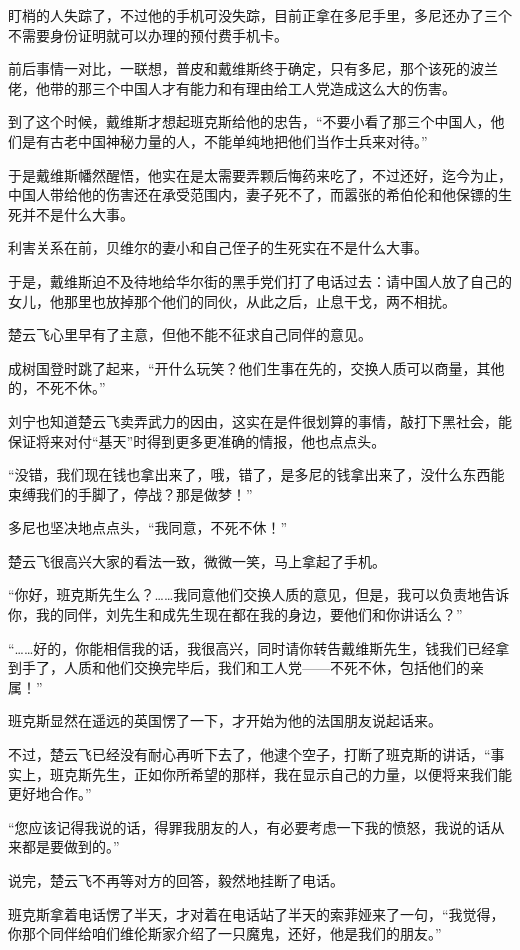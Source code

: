 盯梢的人失踪了，不过他的手机可没失踪，目前正拿在多尼手里，多尼还办了三个不需要身份证明就可以办理的预付费手机卡。

前后事情一对比，一联想，普皮和戴维斯终于确定，只有多尼，那个该死的波兰佬，他带的那三个中国人才有能力和有理由给工人党造成这么大的伤害。

到了这个时候，戴维斯才想起班克斯给他的忠告，“不要小看了那三个中国人，他们是有古老中国神秘力量的人，不能单纯地把他们当作士兵来对待。”

于是戴维斯幡然醒悟，他实在是太需要弄颗后悔药来吃了，不过还好，迄今为止，中国人带给他的伤害还在承受范围内，妻子死不了，而嚣张的希伯伦和他保镖的生死并不是什么大事。

利害关系在前，贝维尔的妻小和自己侄子的生死实在不是什么大事。

于是，戴维斯迫不及待地给华尔街的黑手党们打了电话过去：请中国人放了自己的女儿，他那里也放掉那个他们的同伙，从此之后，止息干戈，两不相扰。

楚云飞心里早有了主意，但他不能不征求自己同伴的意见。

成树国登时跳了起来，“开什么玩笑？他们生事在先的，交换人质可以商量，其他的，不死不休。”

刘宁也知道楚云飞卖弄武力的因由，这实在是件很划算的事情，敲打下黑社会，能保证将来对付“基天”时得到更多更准确的情报，他也点点头。

“没错，我们现在钱也拿出来了，哦，错了，是多尼的钱拿出来了，没什么东西能束缚我们的手脚了，停战？那是做梦！”

多尼也坚决地点点头，“我同意，不死不休！”

楚云飞很高兴大家的看法一致，微微一笑，马上拿起了手机。

“你好，班克斯先生么？……我同意他们交换人质的意见，但是，我可以负责地告诉你，我的同伴，刘先生和成先生现在都在我的身边，要他们和你讲话么？”

“……好的，你能相信我的话，我很高兴，同时请你转告戴维斯先生，钱我们已经拿到手了，人质和他们交换完毕后，我们和工人党——不死不休，包括他们的亲属！”

班克斯显然在遥远的英国愣了一下，才开始为他的法国朋友说起话来。

不过，楚云飞已经没有耐心再听下去了，他逮个空子，打断了班克斯的讲话，“事实上，班克斯先生，正如你所希望的那样，我在显示自己的力量，以便将来我们能更好地合作。”

“您应该记得我说的话，得罪我朋友的人，有必要考虑一下我的愤怒，我说的话从来都是要做到的。”

说完，楚云飞不再等对方的回答，毅然地挂断了电话。

班克斯拿着电话愣了半天，才对着在电话站了半天的索菲娅来了一句，“我觉得，你那个同伴给咱们维伦斯家介绍了一只魔鬼，还好，他是我们的朋友。”

